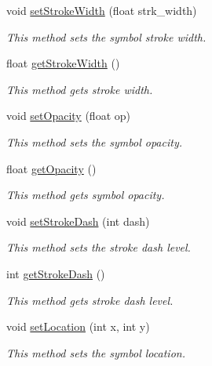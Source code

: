 \begin{DoxyCompactItemize}
void \hyperlink{classbridges_1_1datastructure_1_1_symbol_a56238a4535a26bc3eea698eea4b65921}{set\+Stroke\+Width} (float strk\+\_\+width)
\begin{DoxyCompactList}\small\item\em This method sets the symbol stroke width. \end{DoxyCompactList}\item 
float \hyperlink{classbridges_1_1datastructure_1_1_symbol_a4274feed56b8dfe89ffa3f791ece2ebd}{get\+Stroke\+Width} ()
\begin{DoxyCompactList}\small\item\em This method gets stroke width. \end{DoxyCompactList}\item 
void \hyperlink{classbridges_1_1datastructure_1_1_symbol_a889bace56d39df0ac09ba408ca868b7d}{set\+Opacity} (float op)
\begin{DoxyCompactList}\small\item\em This method sets the symbol opacity. \end{DoxyCompactList}\item 
float \hyperlink{classbridges_1_1datastructure_1_1_symbol_af77f6e4c42ca97672888d863335b851a}{get\+Opacity} ()
\begin{DoxyCompactList}\small\item\em This method gets symbol opacity. \end{DoxyCompactList}\item 
void \hyperlink{classbridges_1_1datastructure_1_1_symbol_afd39d3b65d22bc2a1be64c8728f5e5d7}{set\+Stroke\+Dash} (int dash)
\begin{DoxyCompactList}\small\item\em This method sets the stroke dash level. \end{DoxyCompactList}\item 
int \hyperlink{classbridges_1_1datastructure_1_1_symbol_a5fd32d1310c9ef97b07acab8efb17808}{get\+Stroke\+Dash} ()
\begin{DoxyCompactList}\small\item\em This method gets stroke dash level. \end{DoxyCompactList}\item 
void \hyperlink{classbridges_1_1datastructure_1_1_symbol_a9c62675b598fc5e755721576852f2dcf}{set\+Location} (int x, int y)
\begin{DoxyCompactList}\small\item\em This method sets the symbol location. \end{DoxyCompactList}\item 

\end{DoxyCompactItemize}
